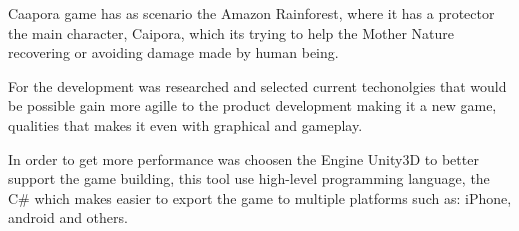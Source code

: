 Caapora game has as scenario the Amazon Rainforest, where it has a protector the main character, Caipora, which its trying to help the Mother Nature recovering or avoiding damage made by human being.

For the development was researched and selected current techonolgies that would be possible gain more agille to the product  development making it a new game, qualities that makes it even with graphical and gameplay.

In order to get more performance was choosen the Engine Unity3D to better support the game building, this tool use high-level programming language, the C\#
which makes easier to export the game to multiple platforms such as: iPhone, android and others.